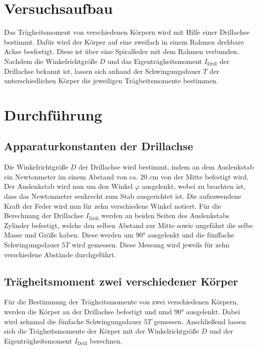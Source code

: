 
\section{Versuchsaufbau}
\label{sec:Versuchsaufbau}
Das Trägheitsmoment von verschiedenen Körpern wird mit Hilfe einer
Drillachse bestimmt. Dafür wird der Körper auf eine zweifach in einem Rahmen 
drehbare Achse besfestigt. Diese ist über eine Spiralfeder mit dem Rahmen 
verbunden. Nachdem die Winkelrichtgröße $D$ und das Eigenträgheitsmoment $I_{\text{Drill}}$
der Drillachse bekannt ist, lassen sich anhand der Schwingungsdauer $T$ der 
unterschiedlichen Körper die jeweiligen Trägbeitsmomente bestimmen.
%
\section{Durchführung}
\label{sec:Durchführung}
\subsection{Apparaturkonstanten der Drillachse}
\label{sec:Apparturkonstanten}
Die Winkelrichtgröße $D$ der Drillachse wird bestimmt, indem an dem Auslenkstab
ein Newtonmeter im einem Abstand von ca. $20\,\,\unit{\centi\meter}$ von der Mitte 
befestigt wird. Der Auslenkstab wird nun um den Winkel $\varphi$ ausgelenkt, wobei zu beachten ist,
dass das Newtonmeter senkrecht zum Stab ausgerichtet ist. Die aufzuwendene Kraft der Feder wird nun
für zehn verschiedene Winkel notiert. Für die Berechnung der Drillachse $I_{\text{Drill}}$ werden an beiden Seiten des 
Auslenkstabs Zylinder befestigt, welche den selben Abstand zur Mitte sowie ungefährt die selbe Masse und Größe
haben. Diese werden um $90°$ ausgelenkt und die fünffache Schwingungsdauer $5T$ wird gemessen. Diese Messung
wird jeweils für zehn verschiedene Abstände durchgeführt.
%
\subsection{Trägheitsmoment zwei verschiedener Körper}
\label{sec:TragheitZweiKörper}
Für die Bestimmung der Trägheitsmomente von zwei verschiedenen Körpern, werden die Körper an der Drillachse
befestigt und umd $90°$ ausgelenkt. Dabei wird zehnmal die fünfache Schwingungsdauer $5T$ gemessen. Anschließend
lassen sich die Trägheitsmomente der Körper mit der Winkelrichtgröße $D$ und der Eigenträgheitsmoment $I_{\text{Drill}}$ berechnen.
